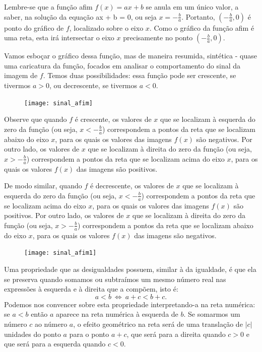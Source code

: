Lembre-se que a função afim $f(x) = ax + b$ se anula em um único valor, a saber, na solução da equação ax + b = 0, ou seja $x =  -\frac{b}{a}$.  Portanto, $(-\frac{b}{a},0)$ é ponto do gráfico de $f$, localizado sobre o eixo $x$. Como o gráfico da função afim é uma reta, esta irá intersectar o eixo $x$ precisamente no ponto $(-\frac{b}{a},0)$.


Vamos esboçar o gráfico dessa função, mas de maneira resumida, sintética - quase uma caricatura da função, focados em analisar o comportamento do sinal da imagem de $f$. Temos duas possibilidades: essa função pode ser crescente, se tivermos $a > 0$, ou decrescente, se tivermos $a < 0$.

\begin{figure}[H]
\centering
\noindent\texttt{[image: sinal\_afim]}
\end{figure}

Observe que quando $f$ é crescente, os valores de $x$ que se localizam à esquerda do zero da função (ou seja, $x < -\frac{b}{a}$) correspondem a pontos da reta que se localizam abaixo do eixo $x$, para os quais os valores das imagens $f(x)$ são negativos. Por outro lado, os valores de $x$ que se localizam à direita do zero da função (ou seja, $x > -\frac{b}{a}$)  correspondem a pontos da reta que se localizam acima do eixo $x$, para os quais os valores $f(x)$ das imagens são positivos.

De modo similar, quando $f$ é decrescente, os valores de $x$ que se localizam à esquerda do zero da função (ou seja, $x < -\frac{b}{a}$) correspondem a pontos da reta que se localizam acima do eixo $x$, para os quais os valores das imagens $f(x)$ são positivos. Por outro lado, os valores de $x$ que se localizam à direita do zero da função (ou seja, $x > -\frac{b}{a}$)  correspondem a pontos da reta que se localizam abaixo do eixo $x$, para os quais os valores $f(x)$ das imagens são negativos.

\begin{figure}[H]
\centering
\noindent\texttt{[image: sinal\_afim1]}
\end{figure}

Uma propriedade que as desigualdades possuem, similar à da igualdade, é que ela se preserva quando somamos ou subtraímos um mesmo número real nas expressões à esquerda e à direita que a compõem, isto é:
$$
a < b \ \iff \ a + c < b +c. 
$$
Podemos nos convencer sobre esta propriedade interpretando-a na reta numérica: se $a < b$ então $a$ aparece na reta numérica à esquerda de $b$. Se somarmos um número $c$ ao número $a$, o efeito geométrico na reta será de uma translação de $|c|$ unidades do ponto $a$ para o ponto $a+c$, que será para a direita quando $c>0$ e que será para a esquerda quando $c <0$.

